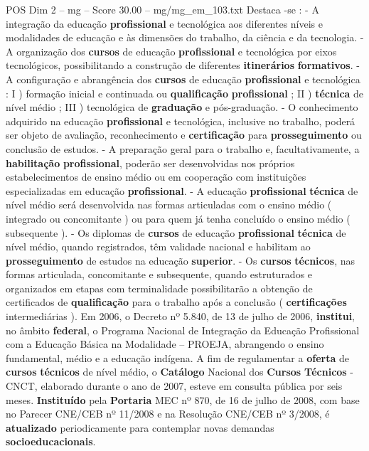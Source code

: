 \begin{textsample}{POS Dim 2 – mg – Score 30.00 – mg/mg\_em\_103.txt}
Destaca -se : - A integração da educação \textbf{profissional} e tecnológica aos diferentes níveis e modalidades de educação e às dimensões do trabalho, da ciência e da tecnologia. - A organização dos \textbf{cursos} de educação \textbf{profissional} e tecnológica por eixos tecnológicos, possibilitando a construção de diferentes \textbf{itinerários} \textbf{formativos}. - A configuração e abrangência dos \textbf{cursos} de educação \textbf{profissional} e tecnológica : I ) formação inicial e continuada ou \textbf{qualificação} \textbf{profissional} ; II ) \textbf{técnica} de nível médio ; III ) tecnológica de \textbf{graduação} e pós-graduação. - O conhecimento adquirido na educação \textbf{profissional} e tecnológica, inclusive no trabalho, poderá ser objeto de avaliação, reconhecimento e \textbf{certificação} para \textbf{prosseguimento} ou conclusão de estudos. - A preparação geral para o trabalho e, facultativamente, a \textbf{habilitação} \textbf{profissional}, poderão ser desenvolvidas nos próprios estabelecimentos de ensino médio ou em cooperação com instituições especializadas em educação \textbf{profissional}. - A educação \textbf{profissional} \textbf{técnica} de nível médio será desenvolvida nas formas articuladas com o ensino médio ( integrado ou concomitante ) ou para quem já tenha concluído o ensino médio ( subsequente ). - Os diplomas de \textbf{cursos} de educação \textbf{profissional} \textbf{técnica} de nível médio, quando registrados, têm validade nacional e habilitam ao \textbf{prosseguimento} de estudos na educação \textbf{superior}. - Os \textbf{cursos} \textbf{técnicos}, nas formas articulada, concomitante e subsequente, quando estruturados e organizados em etapas com terminalidade possibilitarão a obtenção de certificados de \textbf{qualificação} para o trabalho após a conclusão ( \textbf{certificações} intermediárias ).
Em 2006, o Decreto nº 5.840, de 13 de julho de 2006, \textbf{institui}, no âmbito \textbf{federal}, o Programa Nacional de Integração da Educação Profissional com a Educação Básica na Modalidade – PROEJA, abrangendo o ensino fundamental, médio e a educação indígena.
A fim de regulamentar a \textbf{oferta} de \textbf{cursos} \textbf{técnicos} de nível médio, o \textbf{Catálogo} Nacional dos \textbf{Cursos} \textbf{Técnicos} - CNCT, elaborado durante o ano de 2007, esteve em consulta pública por seis meses. \textbf{Instituído} pela \textbf{Portaria} MEC nº 870, de 16 de julho de 2008, com base no Parecer CNE/CEB nº 11/2008 e na Resolução CNE/CEB nº 3/2008, é \textbf{atualizado} periodicamente para contemplar novas demandas \textbf{socioeducacionais}.

\end{textsample}
